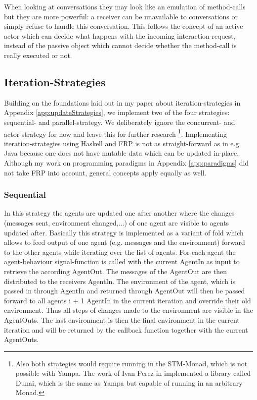 When looking at conversations they may look like an emulation of method-calls but they are more powerful: a receiver can be unavailable to conversations or simply refuse to handle this conversation. This follows the concept of an active actor which can decide what happens with the incoming interaction-request, instead of the passive object which cannot decide whether the method-call is really executed or not.

\subsection{Iteration-Strategies}
Building on the foundations laid out in my paper about iteration-strategies in Appendix \ref{app:updateStrategies}, we implement two of the four strategies: sequential- and parallel-strategy. We deliberately ignore the concurrent- and actor-strategy for now and leave this for further research \footnote{Also both strategies would require running in the STM-Monad, which is not possible with Yampa. The work of Ivan Perez in \cite{perez_functional_2016} implemented a library called Dunai, which is the same as Yampa but capable of running in an arbitrary Monad.}.
Implementing iteration-strategies using Haskell and FRP is not as straight-forward as in e.g. Java because one does not have mutable data which can be updated in-place. Although my work on programming paradigms in Appendix \ref{app:paradigms} did not take FRP into account, general concepts apply equally as well.

\subsubsection{Sequential}
In this strategy the agents are updated one after another where the changes (messages sent, environment changed,...) of one agent are visible to agents updated after. Basically this strategy is implemented as a variant of fold which allows to feed output of one agent (e.g. messages and the environment) forward to the other agents while iterating over the list of agents. For each agent the agent-behaviour signal-function is called with the current AgentIn as input to retrieve the according AgentOut. The messages of the AgentOut are then distributed to the receivers AgentIn.
The environment of the agent, which is passed in through AgentIn and returned through AgentOut will then be passed forward to all agents i + 1 AgentIn in the current iteration and override their old environment. Thus all steps of changes made to the environment are visible in the AgentOuts. The last environment is then the final environment in the current iteration and will be returned by the callback function together with the current AgentOuts.


